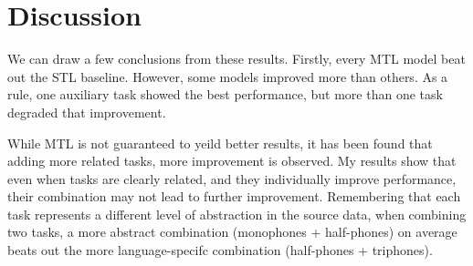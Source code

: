 \documentclass[a4paper]{article}
\begin{document}





\section{Discussion}

We can draw a few conclusions from these results. Firstly, every MTL model beat out the STL baseline. However, some models improved more than others. As a rule, one auxiliary task showed the best performance, but more than one task degraded that improvement.

While MTL is not guaranteed to yeild better results, it has been found that adding more related tasks, more improvement is observed. My results show that even when tasks are clearly related, and they individually improve performance, their combination may not lead to further improvement. Remembering that each task represents a different level of abstraction in the source data, when combining two tasks, a more abstract combination (monophones + half-phones) on average beats out the more language-specifc combination (half-phones + triphones).
\end{document}
